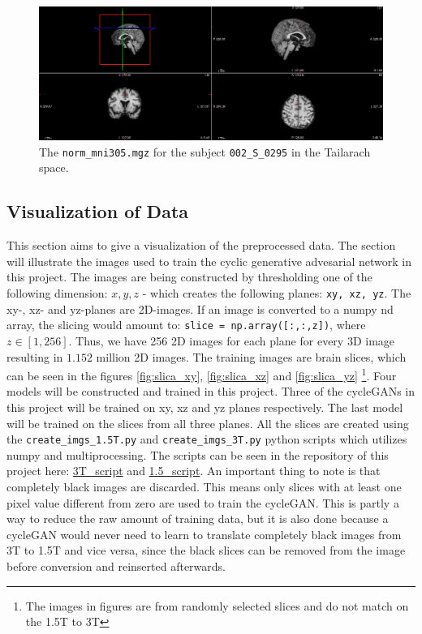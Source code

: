 \documentclass[12pt, fleqn, titlepage]{article}
\newcommand{\1}[1]{\mathds{1}\left[#1\right]}
\begin{document}
\begin{figure}[H]
	\centering
	\includegraphics[width=0.9\linewidth]{imgs/norm_305}
	\caption{The \texttt{norm\_mni305.mgz} for the subject \texttt{002\_S\_0295} in the Tailarach space.} 
	\label{fig:norm305}
\end{figure}


\subsection{Visualization of Data}
This section aims to give a visualization of the preprocessed data. The section will illustrate the images used to train the cyclic generative advesarial network in this project. The images are being constructed by thresholding one of the following dimension: $ x, y, z $ - which creates the following planes: \texttt{xy, xz, yz}. The xy-, xz- and yz-planes are 2D-images. If an image is converted to a numpy nd array, the slicing would amount to: \texttt{slice = np.array([:,:,z])}, where $ z \in [1,256] $. Thus, we have 256 2D images for each plane for every 3D image resulting in $ 1.152 $ million 2D images. The training images are brain slices, which can be seen in the figures \ref{fig:slica_xy}, \ref{fig:slica_xz} and \ref{fig:slica_yz} \footnote{The images in figures are from randomly selected slices and do not match on the 1.5T to 3T}. Four models will be constructed and trained in this project. Three of the cycleGANs in this project will be trained on xy, xz and yz planes respectively. The last model will be trained on the slices from all three planes. All the slices are created using the \texttt{create\_imgs\_1.5T.py} and \texttt{create\_imgs\_3T.py} python scripts which utilizes numpy and multiprocessing. The scripts can be seen in the repository of this project here: \href{https://github.com/oskarwiese/AlzPred/blob/main/preprocessing_scripts/slicing_scripts/3/create_imgs_3T.py}{3T\_script} and \href{https://github.com/oskarwiese/AlzPred/blob/main/preprocessing_scripts/slicing_scripts/1.5/create_imgs_1.5T.py}{1.5\_script}.
An important thing to note is that completely black images are discarded. This means only slices with at least one pixel value different from zero are used to train the cycleGAN. This is partly a way to reduce the raw amount of training data, but it is also done because a cycleGAN would never need to learn to translate completely black images from 3T to 1.5T and vice versa, since the black slices can be removed from the image before conversion and reinserted afterwards.
\end{document}
